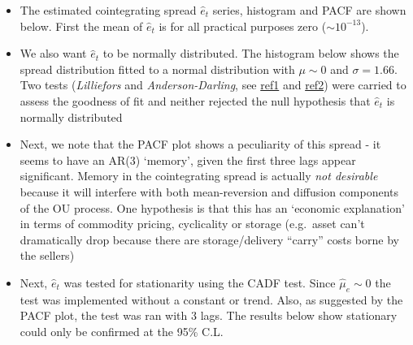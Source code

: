\documentclass{article}
\begin{document}
    \begin{itemize}
\item
  The estimated cointegrating spread \(\hat{e}_t\) series, histogram and
  PACF are shown below. First the mean of \(\hat{e}_t\) is for all
  practical purposes zero (\(\sim10^{-13}\)).
\item
  We also want \(\hat{e}_t\) to be normally distributed. The histogram
  below shows the spread distribution fitted to a normal distribution
  with \(\mu \sim 0\) and \(\sigma=1.66\). Two tests (\emph{Lilliefors}
  and \emph{Anderson-Darling}, see
  \href{http://statsmodels.sourceforge.net/notebooks/generated/statsmodels.stats.diagnostic.normal_ad.html}{ref1}
  and
  \href{http://statsmodels.sourceforge.net/devel/generated/statsmodels.stats.diagnostic.kstest_normal.html}{ref2})
  were carried to assess the goodness of fit and neither rejected the
  null hypothesis that \(\hat{e}_t\) is normally distributed
\item
  Next, we note that the PACF plot shows a peculiarity of this spread -
  it seems to have an AR(3) `memory', given the first three lags appear
  significant. Memory in the cointegrating spread is actually \emph{not
  desirable} because it will interfere with both mean-reversion and
  diffusion components of the OU process. One hypothesis is that this
  has an `economic explanation' in terms of commodity pricing,
  cyclicality or storage (e.g.~asset can't dramatically drop because
  there are storage/delivery ``carry'' costs borne by the sellers)
\item
  Next, \(\hat{e}_t\) was tested for stationarity using the CADF test.
  Since \(\hat{\mu}_e \sim 0\) the test was implemented without a
  constant or trend. Also, as suggested by the PACF plot, the test was
  ran with 3 lags. The results below show stationary could only be
  confirmed at the 95\% C.L.
\end{itemize}
\end{document}
